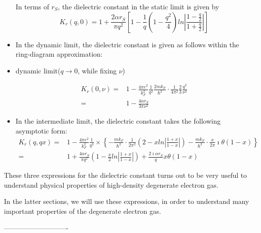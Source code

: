 \begin{itemize}
In terms of $r_S$, the dielectric constant in the static limit is given by
\begin{equation} \label{Eqs2.8.33}
K_r(q,0) = 1+ \frac{2\alpha r_S}{\pi q^2}\left[ 1-\frac{1}{q}(1-\frac{q^2}{4})ln\left| \frac{1-\frac{q}{2}}{1+\frac{q}{2}} \right| \right]
\end{equation}

\item In the dynamic limit, the dielectric constant is given as follows within the ring-diagram approximation:
\item \begin{center}dynamic limit($q \rightarrow 0$, while fixing $\nu$)\end{center}
\begin{equation} \label{Eqs2.8.34} \begin{split}
K_r(0,\nu) =& 1- \frac{4\pi e^2}{k_F^2} \frac{1}{q^2}\frac{2 m k_F}{\hbar^2} \cdot \frac{1}{4\pi^2} \frac{2}{3}\frac{q^2}{\nu^2}\\
=& 1- \frac{4\alpha r_S}{3\pi \nu^2}
\end{split}\end{equation}

\item In the intermediate limit, the dielectric constant takes the following  asymptotic form:
\begin{equation} \label{Eqs2.8.35} \begin{split}
K_r(q,qx) =& 1-\frac{4\pi e^2}{k_F^2}\frac{1}{q^2} \times \left\{ - \frac{m k_F}{\hbar^2}\cdot\frac{1}{2\pi^2}\left( 2-x ln\left| \frac{1+x}{1-x} \right| \right) - \frac{m k_F}{\hbar^2}\cdot \frac{x}{2\pi} \imath \theta(1-x) \right\}\\
=& 1+ \frac{4 \alpha r_S}{\pi q^2}\left( 1-\frac{x}{2} ln\left| \frac{1+x}{1-x} \right|  \right) + \frac{2 \imath \alpha r_S}{q} x \theta(1-x)
\end{split}\end{equation}

\end{itemize}

These three expressions for the dielectric constant turns out to be very useful to understand physical properties of high-density degenerate electron gas.

In the latter sections, we will use these expressions, in order to understand many important properties of the degenerate electron gas.
\begin{center}----------------------------\end{center}

